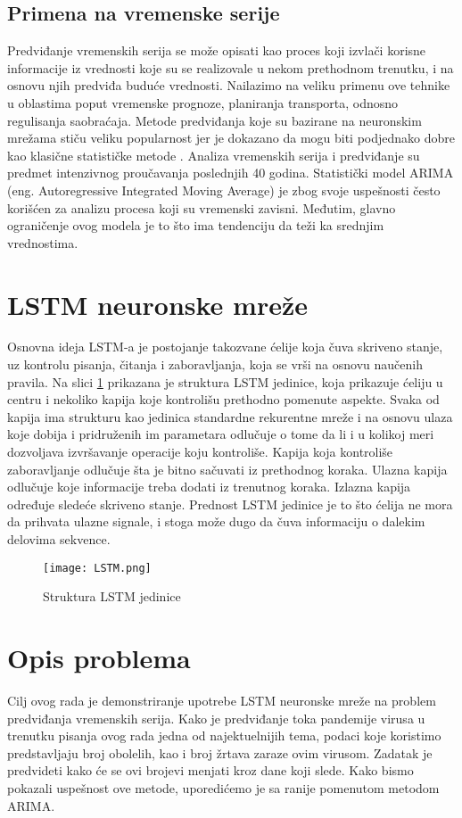 \documentclass[a4paper]{article}
\begin{document}
\subsection{Primena na vremenske serije}
Predviđanje vremenskih serija se može opisati kao proces koji izvlači korisne informacije iz vrednosti koje su se realizovale u nekom prethodnom trenutku, i na osnovu njih predviđa buduće vrednosti. Nailazimo na veliku primenu ove tehnike u oblastima poput vremenske prognoze, planiranja transporta, odnosno regulisanja saobraćaja. Metode predviđanja koje su bazirane na neuronskim mrežama stiču veliku popularnost jer je dokazano da mogu biti podjednako dobre kao klasične statističke metode \cite{siami2018forecasting}. 
Analiza vremenskih serija i predviđanje su predmet intenzivnog proučavanja poslednjih 40 godina. Statistički model ARIMA (eng. Autoregressive Integrated Moving Average) je zbog svoje uspešnosti često korišćen za analizu procesa koji su vremenski zavisni. Međutim, glavno ograničenje ovog modela je to što ima tendenciju da teži ka srednjim vrednostima. 

\section{LSTM neuronske mreže}
Osnovna ideja LSTM-a je postojanje takozvane ćelije koja čuva skriveno stanje, uz kontrolu pisanja, čitanja i zaboravljanja, koja se vrši na osnovu naučenih pravila. Na slici \ref{fig:jedinica} prikazana je struktura LSTM jedinice, koja prikazuje ćeliju u centru i nekoliko kapija koje kontrolišu prethodno pomenute aspekte. Svaka od kapija ima strukturu kao jedinica standardne rekurentne mreže i na osnovu ulaza koje dobija i pridruženih im parametara odlučuje o tome da li i u kolikoj meri dozvoljava izvršavanje operacije koju kontroliše. Kapija koja kontroliše zaboravljanje odlučuje šta je bitno sačuvati iz prethodnog koraka. Ulazna kapija odlučuje koje informacije treba dodati iz trenutnog koraka. Izlazna kapija određuje sledeće skriveno stanje. Prednost LSTM jedinice je to što ćelija ne mora da prihvata ulazne signale, i stoga može dugo da čuva informaciju o dalekim delovima sekvence. 

\begin{figure}[htp]
    \centering
    \texttt{[image: LSTM.png]}
    \caption{Struktura LSTM jedinice}
    \label{fig:jedinica}
\end{figure}



\section{Opis problema}
Cilj ovog rada je demonstriranje upotrebe LSTM neuronske mreže na problem predviđanja vremenskih serija. Kako je predviđanje toka pandemije virusa u trenutku pisanja ovog rada jedna od najektuelnijih tema, podaci koje koristimo predstavljaju broj obolelih, kao i broj žrtava zaraze ovim virusom. Zadatak je predvideti kako će se ovi brojevi menjati kroz dane koji slede. Kako bismo pokazali uspešnost ove metode, uporedićemo je sa ranije pomenutom metodom ARIMA. 
\end{document}
